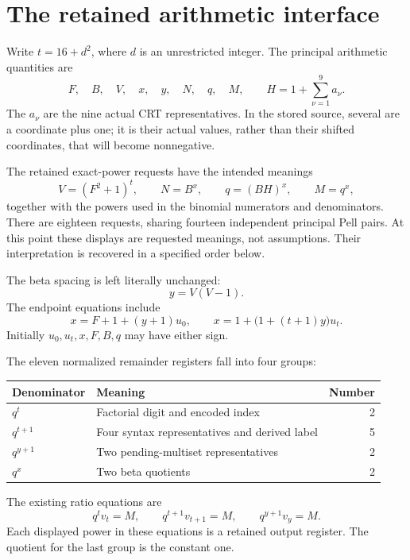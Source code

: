 \section{The retained arithmetic interface}

Write \(t=16+d^2\), where \(d\) is an unrestricted integer. The principal
arithmetic quantities are
\[
 F,\quad B,\quad V,\quad x,\quad y,\quad N,\quad q,\quad
 M,\qquad H=1+\sum_{\nu=1}^{9}a_\nu.
\]
The \(a_\nu\) are the nine actual CRT representatives. In the stored source,
several are a coordinate plus one; it is their actual values, rather than
their shifted coordinates, that will become nonnegative.

The retained exact-power requests have the intended meanings
\begin{equation}\label{eq:power-meanings}
 V=(F^2+1)^t,\qquad N=B^x,\qquad q=(BH)^x,\qquad M=q^x,
\end{equation}
together with the powers used in the binomial numerators and denominators.
There are eighteen requests, sharing fourteen independent principal Pell
pairs. At this point these displays are requested meanings, not assumptions.
Their interpretation is recovered in a specified order below.

The beta spacing is left literally unchanged:
\begin{equation}\label{eq:beta}
 y=V(V-1).
\end{equation}
The endpoint equations include
\begin{equation}\label{eq:endpoints}
 x=F+1+(y+1)u_0,\qquad
 x=1+\bigl(1+(t+1)y\bigr)u_t.
\end{equation}
Initially \(u_0,u_t,x,F,B,q\) may have either sign.

The eleven normalized remainder registers fall into four groups:
\begin{center}
\begin{tabular}{llr}
\hline
Denominator & Meaning & Number\\
\hline
\(q^t\) & Factorial digit and encoded index &2\\
\(q^{t+1}\) & Four syntax representatives and derived label &5\\
\(q^{y+1}\) & Two pending-multiset representatives &2\\
\(q^x\) & Two beta quotients &2\\
\hline
\end{tabular}
\end{center}
The existing ratio equations are
\begin{equation}\label{eq:ratios}
 q^t v_t=M,\qquad q^{t+1}v_{t+1}=M,\qquad
 q^{y+1}v_y=M.
\end{equation}
Each displayed power in these equations is a retained output register.
The quotient for the last group is the constant one.

